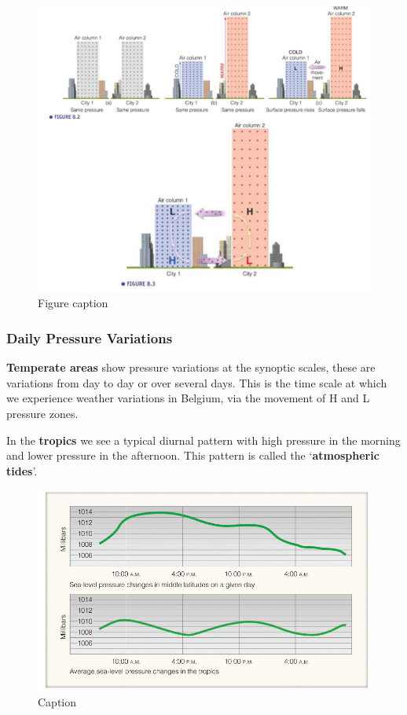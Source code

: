 \documentclass[oneside]{book}
\begin{document}
\begin{figure}
\includegraphics[width=0.8\linewidth]{figures/Figure41andb} \caption{Figure caption}\label{fig:airpressure}
\end{figure}

\subsubsection{Daily Pressure
Variations}\label{daily-pressure-variations}

\textbf{Temperate areas} show pressure variations at the synoptic
scales, these are variations from day to day or over several days. This
is the time scale at which we experience weather variations in Belgium,
via the movement of H and L pressure zones.

In the \textbf{tropics} we see a typical diurnal pattern with high
pressure in the morning and lower pressure in the afternoon. This
pattern is called the `\textbf{atmospheric tides}'.

\begin{figure}

{\centering \includegraphics[width=0.8\linewidth]{figures/Figure42} 

}

\caption{Caption}\label{fig:dailyP}
\end{figure}
\end{document}
